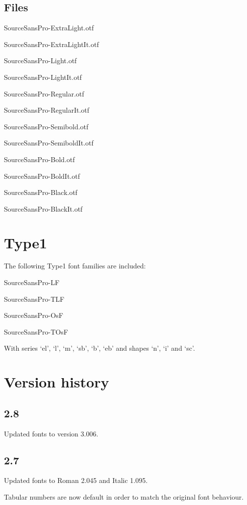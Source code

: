 \documentclass[10pt,a4paper,english]{article}
\begin{document}
\begin{multicols}{2}
\subsection{Files}
\begin{itemize*}
	\item SourceSansPro-ExtraLight.otf
	\item SourceSansPro-ExtraLightIt.otf
	\item SourceSansPro-Light.otf
	\item SourceSansPro-LightIt.otf
	\item SourceSansPro-Regular.otf
	\item SourceSansPro-RegularIt.otf
	\item SourceSansPro-Semibold.otf
	\item SourceSansPro-SemiboldIt.otf
	\item SourceSansPro-Bold.otf
	\item SourceSansPro-BoldIt.otf
	\item SourceSansPro-Black.otf
	\item SourceSansPro-BlackIt.otf
\end{itemize*}

\section{Type1}
The following Type1 font families are included:
\begin{itemize*}
	\item SourceSansPro-LF
	\item SourceSansPro-TLF
	\item SourceSansPro-OsF
	\item SourceSansPro-TOsF
\end{itemize*}
With series ‘el’, ‘l’, ‘m’, ‘sb’, ‘b’, ‘eb’ and shapes ‘n’, ‘i’ and ‘sc’.

\section{Version history}
\subsection*{2.8}
\begin{itemize*}
	\item Updated fonts to version 3.006.
\end{itemize*}

\subsection*{2.7}
\begin{itemize*}
	\item Updated fonts to Roman 2.045 and Italic 1.095.
	\item Tabular numbers are now default in order to match the original font behaviour.
\end{itemize*}


\end{multicols}
\end{document}
